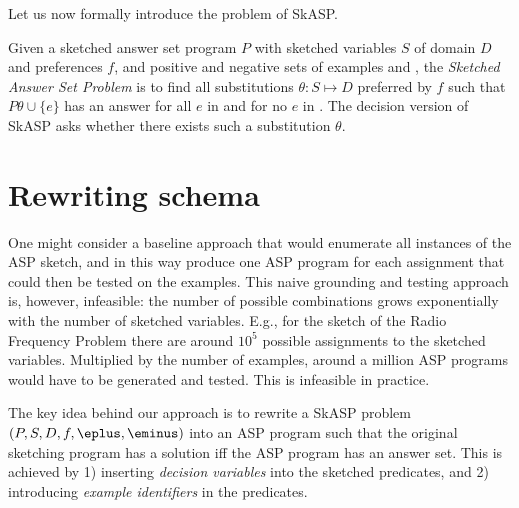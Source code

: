 Let us now formally introduce the problem of SkASP.
\begin{definition}
  Given  a sketched answer set program $P$ with sketched variables $S$ of domain $D$ and preferences $f$, and positive and negative sets of examples \eplus and \eminus, the \emph{Sketched Answer Set Problem} is to find all substitutions $\theta:S\mapsto D$ preferred by $f$ such that $P\theta \cup \{e\}$ has an answer for all $e$ in \eplus and for no $e$ in \eminus. 
%
The decision version 
of SkASP  asks whether there exists such a substitution $\theta$.
\end{definition}

\section{Rewriting schema}\label{sec:method}
One might consider a baseline approach that would enumerate all instances of the ASP sketch, and in this way produce
one ASP program for each assignment that could then be tested on the examples. 
This naive grounding and testing approach is, however, infeasible: the number of possible combinations grows exponentially with the number of sketched variables. E.g., for the sketch of the Radio Frequency Problem \cite{fap} there are around $10^5$ possible assignments to the sketched variables. Multiplied by the number of examples, around a million ASP programs would have to be generated and tested. This is  infeasible in practice.   



The key idea behind our approach is to rewrite a SkASP problem $(P,S,D,f,\eplus,\eminus)$ into an ASP program such that the original sketching program has a solution iff the ASP program has an answer set. 
This is achieved by 1) inserting \textit{decision variables} into the sketched predicates,
and 2) introducing {\em example identifiers} in the predicates. 

